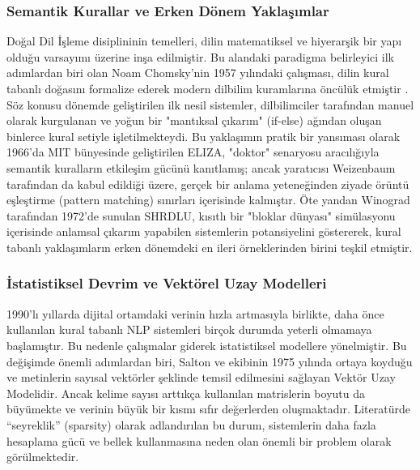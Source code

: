 \documentclass[12pt,a4paper]{report}
\begin{document}
\subsubsection{Semantik Kurallar ve Erken Dönem Yaklaşımlar}
Doğal Dil İşleme disiplininin temelleri, dilin matematiksel ve hiyerarşik bir yapı olduğu varsayımı üzerine inşa edilmiştir. Bu alandaki paradigma belirleyici ilk adımlardan biri olan Noam Chomsky'nin 1957 yılındaki çalışması, dilin kural tabanlı doğasını formalize ederek modern dilbilim kuramlarına öncülük etmiştir \cite{chomsky1957syntactic}. Söz konusu dönemde geliştirilen ilk nesil sistemler, dilbilimciler tarafından manuel olarak kurgulanan ve yoğun bir "mantıksal çıkarım" (if-else) ağından oluşan binlerce kural setiyle işletilmekteydi. Bu yaklaşımın pratik bir yansıması olarak 1966'da MIT bünyesinde geliştirilen ELIZA, "doktor" senaryosu aracılığıyla semantik kuralların etkileşim gücünü kanıtlamış; ancak yaratıcısı Weizenbaum tarafından da kabul edildiği üzere, gerçek bir anlama yeteneğinden ziyade örüntü eşleştirme (pattern matching) sınırları içerisinde kalmıştır. Öte yandan Winograd \cite{winograd1972understanding} tarafından 1972'de sunulan SHRDLU, kısıtlı bir "bloklar dünyası" simülasyonu içerisinde anlamsal çıkarım yapabilen sistemlerin potansiyelini göstererek, kural tabanlı yaklaşımların erken dönemdeki en ileri örneklerinden birini teşkil etmiştir.

\subsubsection{İstatistiksel Devrim ve Vektörel Uzay Modelleri}
1990’lı yıllarda dijital ortamdaki verinin hızla artmasıyla birlikte, daha önce kullanılan kural tabanlı NLP sistemleri birçok durumda yeterli olmamaya başlamıştır. Bu nedenle çalışmalar giderek istatistiksel modellere yönelmiştir. Bu değişimde önemli adımlardan biri, Salton ve ekibinin 1975 yılında ortaya koyduğu ve metinlerin sayısal vektörler şeklinde temsil edilmesini sağlayan Vektör Uzay Modelidir\cite{salton1975vector}. Ancak kelime sayısı arttıkça kullanılan matrislerin boyutu da büyümekte ve verinin büyük bir kısmı sıfır değerlerden oluşmaktadır. Literatürde “seyreklik” (sparsity) olarak adlandırılan bu durum, sistemlerin daha fazla hesaplama gücü ve bellek kullanmasına neden olan önemli bir problem olarak görülmektedir. 
\end{document}
